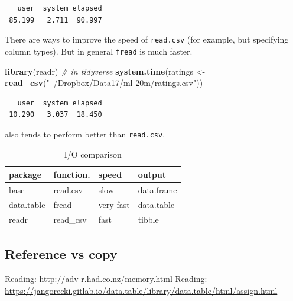\documentclass[]{book}
\newenvironment{Shaded}{\begin{snugshade}}{\end{snugshade}}
\newcommand{\KeywordTok}[1]{\textcolor[rgb]{0.13,0.29,0.53}{\textbf{#1}}}
\newcommand{\StringTok}[1]{\textcolor[rgb]{0.31,0.60,0.02}{#1}}
\newcommand{\CommentTok}[1]{\textcolor[rgb]{0.56,0.35,0.01}{\textit{#1}}}
\newcommand{\NormalTok}[1]{#1}
\theoremstyle{definition}
\theoremstyle{definition}
\theoremstyle{definition}
\theoremstyle{remark}
\begin{document}
\begin{verbatim}
   user  system elapsed 
 85.199   2.711  90.997 
\end{verbatim}

There are ways to improve the speed of \texttt{read.csv} (for example,
but specifying column types). But in general \texttt{fread} is much
faster.

\begin{Shaded}
\begin{Highlighting}[]
\KeywordTok{library}\NormalTok{(readr) }\CommentTok{# in tidyverse}
\KeywordTok{system.time}\NormalTok{(ratings <-}\StringTok{ }\KeywordTok{read_csv}\NormalTok{(}\StringTok{"~/Dropbox/Data17/ml-20m/ratings.csv"}\NormalTok{))}
\end{Highlighting}
\end{Shaded}

\begin{verbatim}
   user  system elapsed 
 10.290   3.037  18.450 
\end{verbatim}

also tends to perform better than \texttt{read.csv}.

\begin{table}

\caption{\label{tab:unnamed-chunk-108}I/O comparison}
\centering
\begin{tabular}[t]{l|l|l|l}
\hline
package & function. & speed & output\\
\hline
base & read.csv & slow & data.frame\\
\hline
data.table & fread & very fast & data.table\\
\hline
readr & read\_csv & fast & tibble\\
\hline
\end{tabular}
\end{table}

\subsection{Reference vs copy}\label{reference-vs-copy}

Reading: \url{http://adv-r.had.co.nz/memory.html} Reading:
\url{https://jangorecki.gitlab.io/data.table/library/data.table/html/assign.html}
\end{document}
